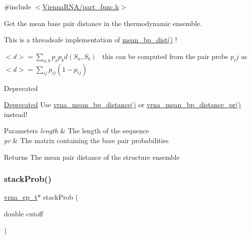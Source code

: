 {\ttfamily \#include $<$\hyperlink{part__func_8h}{Vienna\+R\+N\+A/part\+\_\+func.\+h}$>$}



Get the mean base pair distance in the thermodynamic ensemble. 

This is a threadsafe implementation of \hyperlink{part__func_8h_ae9556ba7ded44fe2321b6f67c3fc02a3}{mean\+\_\+bp\+\_\+dist()} !

$<d> = \sum_{a,b} p_a p_b d(S_a,S_b)$~\newline
this can be computed from the pair probs $p_ij$ as~\newline
 $<d> = \sum_{ij} p_{ij}(1-p_{ij})$

\begin{DoxyRefDesc}{Deprecated}
\item[\hyperlink{deprecated__deprecated000102}{Deprecated}]Use \hyperlink{group__part__func__global_gaa6b8983b559b9ef4b2e1b31113ea317b}{vrna\+\_\+mean\+\_\+bp\+\_\+distance()} or \hyperlink{group__part__func__global_gad3f0c240512e6d43e2e4d4c2076021f5}{vrna\+\_\+mean\+\_\+bp\+\_\+distance\+\_\+pr()} instead!\end{DoxyRefDesc}



\begin{DoxyParams}{Parameters}
{\em length} & The length of the sequence \\
\hline
{\em pr} & The matrix containing the base pair probabilities \\
\hline
\end{DoxyParams}
\begin{DoxyReturn}{Returns}
The mean pair distance of the structure ensemble 
\end{DoxyReturn}
\mbox{\label{group__part__func__global__deprecated_ga8f18624bcd0b47d1a266d9e5527e5362}} 
\subsubsection{\texorpdfstring{stack\+Prob()}{stackProb()}}
{\footnotesize\ttfamily \hyperlink{group__struct__utils__plist_gab9ac98ab55ded9fb90043b024b915aca}{vrna\+\_\+ep\+\_\+t}$\ast$ stack\+Prob (\begin{DoxyParamCaption}\item[{double}]{cutoff }\end{DoxyParamCaption})}




